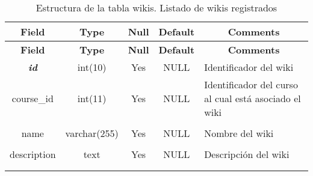 %
%
\begin{longtable}{c c c c l}
	\multicolumn{1}{c}{\textbf{Field}} &
	\multicolumn{1}{c}{\textbf{Type}} &
	\multicolumn{1}{c}{\textbf{Null}} &
	\multicolumn{1}{c}{\textbf{Default}} &
	\multicolumn{1}{c}{\textbf{Comments}} \\ \hline \hline
\endfirsthead
	\multicolumn{1}{c}{\textbf{Field}} &
	\multicolumn{1}{c}{\textbf{Type}} &
	\multicolumn{1}{c}{\textbf{Null}} &
	\multicolumn{1}{c}{\textbf{Default}} &
	\multicolumn{1}{c}{\textbf{Comments}} \\ \hline \hline
\endhead \endfoot
	\textbf{\textit{id}} & int(10) & Yes & NULL & \parbox[t]{0.35\textwidth}{Identificador del wiki}\\ \hline 
	course\_id & int(11) & Yes & NULL & \parbox[t]{0.35\textwidth}{Identificador del curso al cual está asociado el wiki} \\ \\  \hline
	name & varchar(255) & Yes & NULL & \parbox[t]{0.35\textwidth}{Nombre del wiki} \\ \\  \hline
	description & text & Yes & NULL & \parbox[t]{0.35\textwidth}{Descripción del wiki} \\ \\
 \caption[Estructura de la tabla wikis]{Estructura de la tabla wikis. Listado de wikis registrados} \label{tab:wiki_wikis-structure} \\
\end{longtable}
